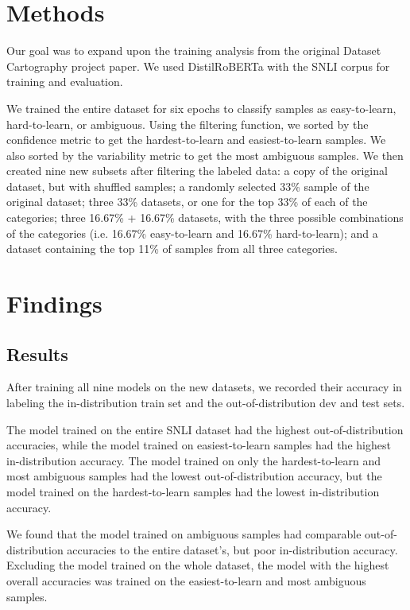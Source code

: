\documentclass[11pt, a4paper, twocolumn]{article}
\begin{document}
	\section{Methods}
	
	Our goal was to expand upon the training analysis from the original Dataset Cartography project paper. We used DistilRoBERTa with the SNLI corpus for training and evaluation.
	
	We trained the entire dataset for six epochs to classify samples as easy-to-learn, hard-to-learn, or ambiguous. Using the filtering function, we sorted by the confidence metric to get the hardest-to-learn and easiest-to-learn samples. We also sorted by the variability metric to get the most ambiguous samples. We then created nine new subsets after filtering the labeled data: a copy of the original dataset, but with shuffled samples; a randomly selected 33\% sample of the original dataset; three 33\% datasets, or one for the top 33\% of each of the categories; three 16.67\% + 16.67\% datasets, with the three possible combinations of the categories (i.e. 16.67\% easy-to-learn and 16.67\% hard-to-learn); and a dataset containing the top 11\% of samples from all three categories.
	
	\section{Findings}
	
	\subsection{Results}
	
	After training all nine models on the new datasets, we recorded their accuracy in labeling the in-distribution train set and the out-of-distribution dev and test sets.
	
	The model trained on the entire SNLI dataset had the highest out-of-distribution accuracies, while the model trained on easiest-to-learn samples had the highest in-distribution accuracy. The model trained on only the hardest-to-learn and most ambiguous samples had the lowest out-of-distribution accuracy, but the model trained on the hardest-to-learn samples had the lowest in-distribution accuracy. 
	
	We found that the model trained on ambiguous samples had comparable out-of-distribution accuracies to the entire dataset's, but poor in-distribution accuracy. Excluding the model trained on the whole dataset, the model with the highest overall accuracies was trained on the easiest-to-learn and most ambiguous samples. 
	
\end{document}
